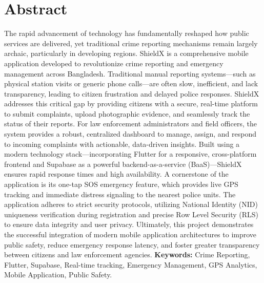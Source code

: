 \documentclass[12pt, a4paper, twoside]{report}
\begin{document}
\chapter*{Abstract}
The rapid advancement of technology has fundamentally reshaped how public services are delivered, yet traditional crime reporting mechanisms remain largely archaic, particularly in developing regions. ShieldX is a comprehensive mobile application developed to revolutionize crime reporting and emergency management across Bangladesh. Traditional manual reporting systems---such as physical station visits or generic phone calls---are often slow, inefficient, and lack transparency, leading to citizen frustration and delayed police responses. 
ShieldX addresses this critical gap by providing citizens with a secure, real-time platform to submit complaints, upload photographic evidence, and seamlessly track the status of their reports. For law enforcement administrators and field officers, the system provides a robust, centralized dashboard to manage, assign, and respond to incoming complaints with actionable, data-driven insights. Built using a modern technology stack---incorporating Flutter for a responsive, cross-platform frontend and Supabase as a powerful backend-as-a-service (BaaS)---ShieldX ensures rapid response times and high availability. 
A cornerstone of the application is its one-tap SOS emergency feature, which provides live GPS tracking and immediate distress signaling to the nearest police units. The application adheres to strict security protocols, utilizing National Identity (NID) uniqueness verification during registration and precise Row Level Security (RLS) to ensure data integrity and user privacy. Ultimately, this project demonstrates the successful integration of modern mobile application architectures to improve public safety, reduce emergency response latency, and foster greater transparency between citizens and law enforcement agencies.
\vspace{0.5cm}
\noindent\textbf{Keywords:} Crime Reporting, Flutter, Supabase, Real-time tracking, Emergency Management, GPS Analytics, Mobile Application, Public Safety.
\tableofcontents
\clearpage
\listoffigures
{}
\listoftables
{}
\clearpage
\end{document}
